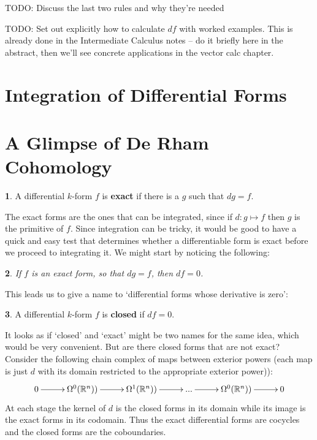 \documentclass[oneside,english]{amsbook}
\numberwithin{section}{chapter}
\theoremstyle{plain}
\newtheorem{thm}{\protect\theoremname}
\theoremstyle{definition}
\newtheorem{defn}[thm]{\protect\definitionname}
\providecommand{\definitionname}{Definition}
\providecommand{\theoremname}{Theorem}
\begin{document}
			TODO: Discuss the last two rules and why they're needed
			
			TODO: Set out explicitly how to calculate $df$ with worked examples. This is already done in the Intermediate Calculus notes -- do it briefly here in the abstract, then we'll see concrete applications in the vector calc chapter.
			
	
		\section{Integration of Differential Forms}
		
			

		\section{A Glimpse of De Rham Cohomology}
		
			\begin{defn}
				A differential $k$-form $f$ is \textbf{exact} if there is a $g$ such that $dg = f$. 
			\end{defn}
			
			The exact forms are the ones that can be integrated, since if $d:g\mapsto f$ then $g$ is the primitive of $f$. Since integration can be tricky, it would be good to have a quick and easy test that determines whether a differentiable form is exact before we proceed to integrating it. We might start by noticing the following:

			\begin{thm}
				If $f$ is an exact form, so that $dg = f$, then $df = 0$.
			\end{thm}
			
			This leads us to give a name to `differential forms whose derivative is zero':
			
			\begin{defn}
				A differential $k$-form $f$ is \textbf{closed} if $df = 0$. 
			\end{defn}
	
			It looks as if `closed' and `exact' might be two names for the same idea, which would be very convenient. But are there closed forms that are not exact? Consider the following chain complex of maps between exterior powers (each map is just $d$ with its domain restricted to the appropriate exterior power)):		
			\[ 
			\xymatrix@C+0.3em{
				0 \ar[r] & \Omega^0(\mathbb{R}^n))\ar[r] & \Omega^1(\mathbb{R}^n))\ar[r] & ... \ar[r] & \Omega^0(\mathbb{R}^n))\ar[r]  & 0
			}
			\]
			At each stage the kernel of $d$ is the closed forms in its domain while its image is the exact forms in its codomain. Thus the exact differential forms are cocycles and the closed forms are the coboundaries.
			
\end{document}
